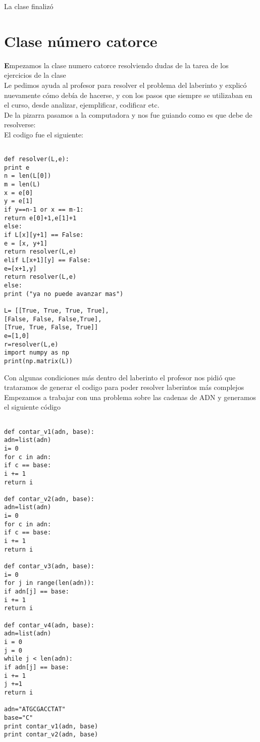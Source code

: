\documentclass{book}
\begin{document}
\begin{enumerate}
\begin{enumerate}
La clase finalizó

\chapter{Clase número catorce}
 
\textbf Empezamos la clase numero catorce resolviendo dudas de la tarea de los ejercicios de la clase\\
Le pedimos ayuda al profesor para resolver el problema del laberinto  y explicó nuevamente cómo debía de hacerse, y con los pasos que siempre se utilizaban en el curso, desde analizar, ejemplificar, codificar etc.\\
De la pizarra pasamos a la computadora y nos fue guiando como es que debe de resolverse:\\
El codigo fue el siguiente: \\
\begin{verbatim}

def resolver(L,e):
print e
n = len(L[0])
m = len(L)
x = e[0]
y = e[1]
if y==n-1 or x == m-1: 
return e[0]+1,e[1]+1
else:
if L[x][y+1] == False:
e = [x, y+1]
return resolver(L,e)
elif L[x+1][y] == False:
e=[x+1,y]
return resolver(L,e)
else:
print ("ya no puede avanzar mas")

L= [[True, True, True, True],
[False, False, False,True],
[True, True, False, True]]  
e=[1,0]
r=resolver(L,e)
import numpy as np
print(np.matrix(L))
\end{verbatim}
Con algunas condiciones más dentro del laberinto el profesor nos pidió que trataramos de generar el codigo para poder resolver laberintos más complejos\\

Empezamos a trabajar con una problema sobre las cadenas de ADN y generamos el siguiente código 
\begin{verbatim}

def contar_v1(adn, base):
adn=list(adn)
i= 0
for c in adn:
if c == base:
i += 1
return i

def contar_v2(adn, base):
adn=list(adn)
i= 0
for c in adn:
if c == base:
i += 1
return i

def contar_v3(adn, base):
i= 0
for j in range(len(adn)):
if adn[j] == base:
i += 1
return i

def contar_v4(adn, base):
adn=list(adn)
i = 0
j = 0 
while j < len(adn):
if adn[j] == base:
i += 1
j +=1
return i

adn="ATGCGACCTAT"
base="C"
print contar_v1(adn, base)
print contar_v2(adn, base)


\end{verbatim}
\end{enumerate}
\end{enumerate}
\end{document}
